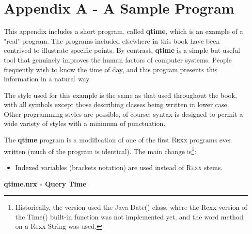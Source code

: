 \chapter{Appendix A - A Sample \nr{} Program}\label{refappa}
 
This appendix includes a short program, called \textbf{qtime}, which
is an example of a "real" \nr{} program.  The programs included
elsewhere in this book have been contrived to illustrate specific
points.  By contrast, \textbf{qtime} is a simple but useful tool that
genuinely improves the human factors of computer systems.  People
frequently wish to know the time of day, and this program presents this
information in a natural way.
 
The style used for this example is the same as that used throughout
the
book,
with all symbols except those describing classes being written
in lower case.  Other \nr{} programming styles are possible, of
course; \nr{} syntax is designed to permit a wide variety of styles
with a minimum of punctuation.
 
The \textbf{qtime} program is a modification of one of the first R\textsc{exx}
programs ever written (much of the program is identical).  The main
change is\footnote{Historically, the \nr{} version used the Java
Date() class, where the Rexx version of the Time() built-in function
was not implemented yet, and the word method on a Rexx String was used.}:
\begin{itemize}
\item Indexed variables (brackets notation) are used instead of R\textsc{exx}
stems.
\end{itemize}
 
\index{,}
\textbf{qtime.nrx - Query Time}

